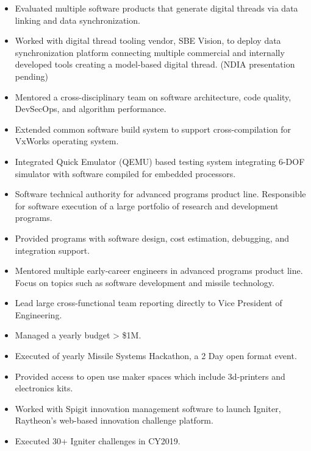 \EndJob
{}
    \begin{itemize}
        \item Evaluated multiple software products that generate digital threads via data linking and data synchronization.
        \item Worked with digital thread tooling vendor, SBE Vision, to deploy data synchronization platform connecting multiple commercial and internally developed tools creating a model-based digital thread. (NDIA presentation pending)
    \end{itemize}
    \begin{itemize}
        \item Mentored a cross-disciplinary team on software architecture, code quality, DevSecOps, and algorithm performance.
        \item Extended common software build system to support cross-compilation for VxWorks operating system.
        \item Integrated Quick Emulator (QEMU) based testing system integrating 6-DOF simulator with software compiled for embedded processors.
    \end{itemize}
    \begin{itemize} 
        \item Software technical authority for advanced programs product line. Responsible for software execution of a large portfolio of research and development programs.
        \item Provided programs with software design, cost estimation, debugging, and integration support.
        \item Mentored multiple early-career engineers in advanced programs product line. Focus on topics such as software development and missile technology.
    \end{itemize}
\EndJob
{}
    \begin{itemize}
            \item Lead large cross-functional team reporting directly to Vice President of Engineering.
            \item Managed a yearly budget > \$1M.
            \item Executed of yearly Missile Systems Hackathon, a 2 Day open format event.
            \item Provided access to open use maker spaces which include 3d-printers and electronics kits.
            \item Worked with Spigit innovation management software to launch Igniter, Raytheon's web-based innovation challenge platform.
            \item Executed 30+ Igniter challenges in CY2019.
    \end{itemize}

